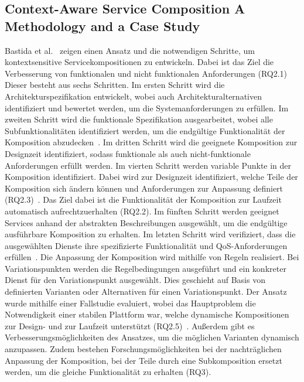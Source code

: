 \documentclass[conference,compsoc,ngerman]{IEEEtran}
\begin{document}
\subsection{Context-Aware Service Composition  A Methodology and a Case Study}
Bastida et al.~\cite{bastida2008context} zeigen einen Ansatz und die notwendigen Schritte, um kontextsensitive Servicekompositionen zu entwickeln. Dabei ist das Ziel die Verbesserung von funktionalen und nicht funktionalen Anforderungen (RQ2.1) Dieser besteht aus sechs Schritten. Im ersten Schritt wird die Architekturspezifikation entwickelt, wobei auch Architekturalternativen identifiziert und bewertet werden, um die Systemanforderungen zu erfüllen. Im zweiten Schritt wird die funktionale Spezifikation ausgearbeitet, wobei alle Subfunktionalitäten identifiziert werden, um die endgültige Funktionalität der Komposition abzudecken~\cite{bastida2008context}. Im dritten Schritt wird die geeignete Komposition zur Designzeit identifiziert, sodass funktionale als auch nicht-funktionale Anforderungen erfüllt werden. Im vierten Schritt werden variable Punkte in der Komposition identifiziert. Dabei wird zur Designzeit identifiziert, welche Teile der Komposition sich ändern können und Anforderungen zur Anpassung definiert (RQ2.3)~\cite{bastida2008context}. Das Ziel dabei ist die Funktionalität der Komposition zur Laufzeit automatisch aufrechtzuerhalten (RQ2.2). Im fünften Schritt werden geeignet Services anhand der abstrakten Beschreibungen ausgewählt, um die endgültige ausführbare Komposition zu erhalten. Im letzten Schritt wird verifiziert, dass die ausgewählten Dienste ihre spezifizierte Funktionalität und QoS-Anforderungen erfüllen~\cite{bastida2008context}.
Die Anpassung der Komposition wird mithilfe von Regeln realisiert. Bei Variationspunkten werden die Regelbedingungen ausgeführt und ein konkreter Dienst für den Variationspunkt ausgewählt. Dies geschieht auf Basis von definierten Varianten oder Alternativen für einen Variationspunkt.
Der Ansatz wurde mithilfe einer Fallstudie evaluiert, wobei das Hauptproblem die Notwendigkeit einer stabilen Plattform war, welche dynamische Kompositionen zur Design- und zur Laufzeit unterstützt (RQ2.5)~\cite{bastida2008context}. Außerdem gibt es Verbesserungsmöglichkeiten des Ansatzes, um die möglichen Varianten dynamisch anzupassen. Zudem bestehen Forschungsmöglichkeiten bei der nachträglichen Anpassung der Komposition, bei der Teile durch eine Subkomposition ersetzt werden, um die gleiche Funktionalität zu erhalten (RQ3).
\end{document}
